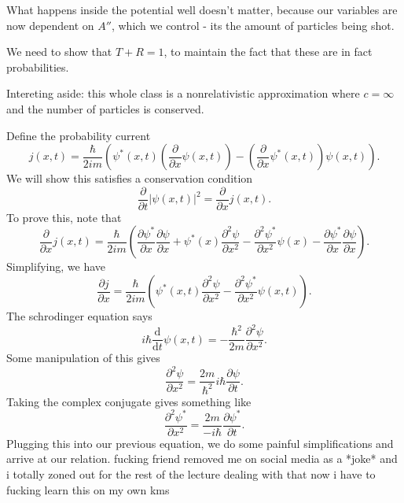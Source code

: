 What happens inside the potential well doesn't matter, because our variables are now dependent on $A''$, which we control - its the amount of particles being shot.

We need to show that $T+R=1$, to maintain the fact that these are in fact probabilities.

Intereting aside: this whole class is a nonrelativistic approximation where $c=\infty $ and the number of particles is conserved.

Define the probability current
\[
	j(x,t)=\frac{\hbar }{2im} \left( \psi ^*(x,t)\left(\frac{\partial }{\partial x} \psi (x,t)\right)-\left(\frac{\partial }{\partial x} \psi ^*(x,t)\right)\psi (x,t) \right) 
.\]
We will show this satisfies a conservation condition
\[
	\frac{\partial }{\partial t} \left| \psi (x,t) \right| ^2=\frac{\partial }{\partial x} j(x,t)
.\]
To prove this, note that
\[
	\frac{\partial }{\partial x} j(x,t)=\frac{\hbar }{2im} \left( \frac{\partial \psi ^*}{\partial x} \frac{\partial \psi }{\partial x} +\psi ^*(x)\frac{\partial ^2\psi }{\partial x^2} -\frac{\partial ^2\psi ^*}{\partial x^2} \psi (x)-\frac{\partial \psi ^*}{\partial x} \frac{\partial \psi }{\partial x}  \right) 
.\]
Simplifying, we have
\[
	\frac{\partial j}{\partial x} =\frac{\hbar }{2im} \left( \psi ^*(x,t)\frac{\partial ^2\psi }{\partial x^2} -\frac{\partial ^2\psi ^*}{\partial x^2} \psi (x,t) \right) 
.\]
The schrodinger equation says
\[
	i\hbar \frac{\mathrm{d}}{\mathrm{d}t} \psi (x,t)=-\frac{\hbar ^2}{2m} \frac{\partial ^2\psi }{\partial x^2} 
.\]
Some manipulation of this gives
\[
	\frac{\partial ^2\psi }{\partial x^2} =\frac{2m}{\hbar ^2} i\hbar \frac{\partial \psi }{\partial t} 
.\]
Taking the complex conjugate gives something like
\[
	\frac{\partial ^2\psi ^*}{\partial x^2} =\frac{2m}{-i\hbar } \frac{\partial \psi ^*}{\partial t} 
.\]
Plugging this into our previous equation, we do some painful simplifications and arrive at our relation. fucking friend removed me on social media as a *joke* and i totally zoned out for the rest of the lecture dealing with that now i have to fucking learn this on my own kms
